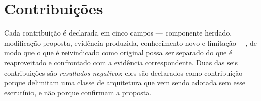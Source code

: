 \section{Contribuições}
\label{sec:intro-contribuicoes}

Cada contribuição é declarada em cinco campos --- componente herdado, modificação
proposta, evidência produzida, conhecimento novo e limitação ---, de modo que o que é
reivindicado como original possa ser separado do que é reaproveitado e confrontado com
a evidência correspondente. Duas das seis contribuições são \emph{resultados
negativos}: eles são declarados como contribuição porque delimitam uma classe de
arquitetura que vem sendo adotada sem esse escrutínio, e não porque confirmam a
proposta.

